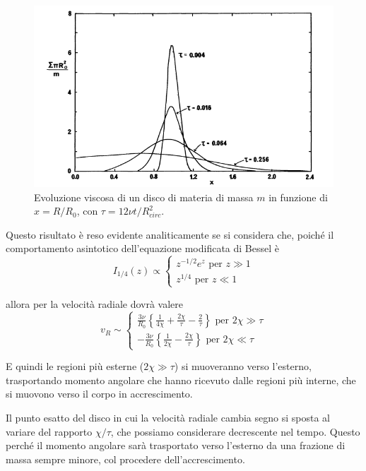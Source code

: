 \documentclass[a4paperbi]{article}
\begin{document}
	\begin{figure}[H]
		\centering
		\includegraphics[width=0.9\linewidth]{DensSuper}
		\caption{Evoluzione viscosa di un disco di materia di massa $m$ in funzione di $x=R/R_0$, con $\tau=12\nu t/R_{circ}^2$.}
		\label{fig:denssuper}
	\end{figure}

	Questo risultato è reso evidente analiticamente se si considera che, poiché il comportamento asintotico dell'equazione modificata di Bessel è
	\begin{equation*}
		I_{1/4}(z)\propto\begin{cases}
				z^{-1/2}e^z\text{ per $z\gg1$}\\
				z^{1/4}\text{ per $z\ll1$}
			\end{cases}
	\end{equation*}
	 
	allora per la velocità radiale dovrà valere
	\begin{equation*}
		v_R\sim\begin{cases}
			\frac{3\nu}{R_0}\left\{\frac{1}{4\chi}+\frac{2\chi}{\tau}-\frac{2}{\tau}\right\}\text{ per $2\chi\gg\tau$}\\
			-\frac{3\nu}{R_0}\left\{\frac{1}{2\chi}-\frac{2\chi}{\tau}\right\}\text{ per $2\chi\ll\tau$}			
			\end{cases}
	\end{equation*}
	
	E quindi le regioni più esterne ($2\chi\gg\tau$) si muoveranno verso l'esterno, trasportando momento angolare che hanno ricevuto dalle regioni più interne, che si muovono verso il corpo in accrescimento.
	
	Il punto esatto del disco in cui la velocità radiale cambia segno si sposta al variare del rapporto $\chi/\tau$, che possiamo considerare decrescente nel tempo. Questo perché il momento angolare sarà trasportato verso l'esterno da una frazione di massa sempre minore, col procedere dell'accrescimento.
	
\end{document}
